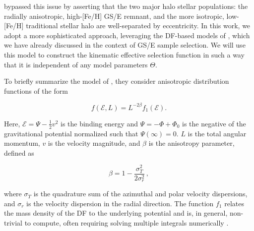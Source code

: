 \cite{mackereth20} bypassed this issue by asserting that the two major halo stellar populations: the radially anisotropic, high-[Fe/H] GS/E remnant, and the more isotropic, low-[Fe/H] traditional stellar halo are well-separated by eccentricity. In this work, we adopt a more sophisticated approach, leveraging the DF-based models of \cite{lane22}, which we have already discussed in the context of GS/E sample selection. We will use this model to construct the kinematic effective selection function in such a way that it is independent of any model parameters $\Theta$.

To briefly summarize the model of \cite{lane22}, they consider anisotropic distribution functions of the form \parencite[see, e.g.][]{binney08}

\begin{equation}
    \label{ch3:eq:anisotropic-df}
    f(\mathcal{E},L) = L^{-2\beta}f_{1}(\mathcal{E}).
\end{equation}

\noindent Here, $\mathcal{E} = \Psi - \frac{1}{2}v^{2}$ is the binding energy and $\Psi = -\Phi + \Phi_{0}$ is the negative of the gravitational potential normalized such that $\Psi(\infty) = 0$. $L$ is the total angular momentum, $v$ is the velocity magnitude, and $\beta$ is the anisotropy parameter, defined as

\begin{equation}
    \label{ch3:eq:beta}
    \beta = 1- \frac{\sigma_{T}^{2}}{2\sigma^{2}_{r}}\,,
\end{equation}

\noindent where $\sigma_{T}$ is the quadrature sum of the azimuthal and polar velocity dispersions, and $\sigma_{r}$ is the velocity dispersion in the radial direction. The function $f_{1}$ relates the mass density of the DF to the underlying potential and is, in general, non-trivial to compute, often requiring solving multiple integrals numerically \parencite[For more information see ][ particularly Appendix A]{lane22}.

